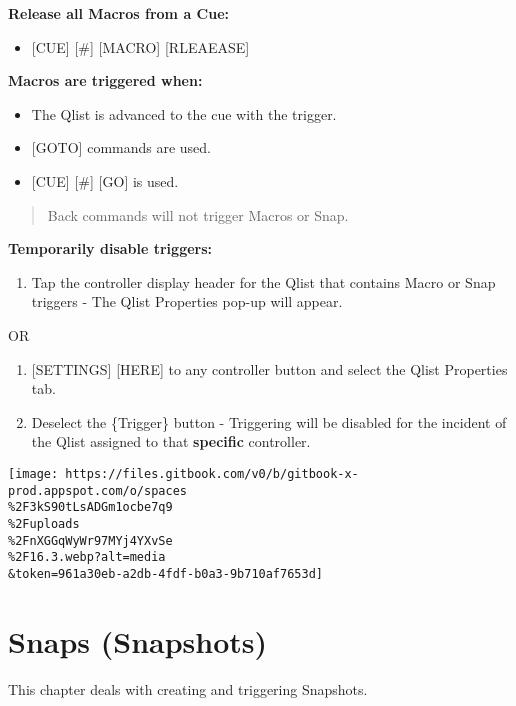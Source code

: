 \documentclass[
]{article}
\providecommand{\tightlist}{%
  \setlength{\itemsep}{0pt}\setlength{\parskip}{0pt}}
\begin{document}
\textbf{Release all Macros from a Cue:}

\begin{itemize}
\tightlist
\item
  {[}CUE{]} {[}\#{]} {[}MACRO{]} {[}RLEAEASE{]}
\end{itemize}

\textbf{Macros are triggered when:}

\begin{itemize}
\item
  The Qlist is advanced to the cue with the trigger.
\item
  {[}GOTO{]} commands are used.
\item
  {[}CUE{]} {[}\#{]} {[}GO{]} is used.
\end{itemize}

\begin{quote}
Back commands will not trigger Macros or Snap.
\end{quote}

\textbf{Temporarily disable triggers:}

\begin{enumerate}
\def\labelenumi{\arabic{enumi}.}
\tightlist
\item
  Tap the controller display header for the Qlist that contains Macro or Snap triggers - The Qlist Properties pop-up will appear.
\end{enumerate}

OR

\begin{enumerate}
\def\labelenumi{\arabic{enumi}.}
\item
  {[}SETTINGS{]} {[}HERE{]} to any controller button and select the Qlist Properties tab.
\item
  Deselect the \{Trigger\} button - Triggering will be disabled for the incident of the Qlist assigned to that \textbf{specific} controller.
\end{enumerate}

\texttt{[image: https://files.gitbook.com/v0/b/gitbook-x-prod.appspot.com/o/spaces\\\%2F3kS90tLsADGm1ocbe7q9\\\%2Fuploads\\\%2FnXGGqWyWr97MYj4YXvSe\\\%2F16.3.webp?alt=media\\\&token=961a30eb-a2db-4fdf-b0a3-9b710af7653d]}

\hypertarget{snaps-snapshots}{%
\section{Snaps (Snapshots)}\label{snaps-snapshots}}

This chapter deals with creating and triggering Snapshots.
\end{document}
